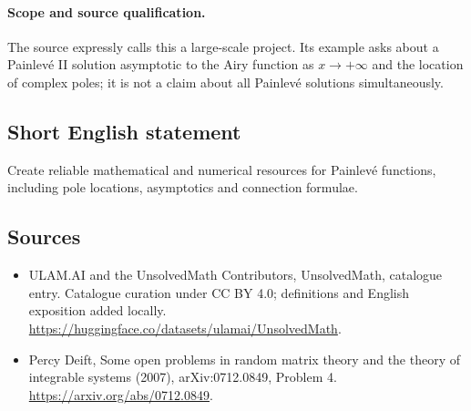 \documentclass[11pt]{article}
\begin{document}
\paragraph{Scope and source qualification.}The source expressly calls this a large-scale project. Its example asks about a Painlevé II solution asymptotic to the Airy function as $x\to+\infty$ and the location of complex poles; it is not a claim about all Painlevé solutions simultaneously.
\subsection{Short English statement}
Create reliable mathematical and numerical resources for Painlevé functions, including pole locations, asymptotics and connection formulae.
\subsection{Sources}
\begin{itemize}
\item[\hypertarget{source:statement:1}{S1}] ULAM.AI and the UnsolvedMath Contributors, UnsolvedMath, catalogue entry. Catalogue curation under CC BY 4.0; definitions and English exposition added locally.
\url{https://huggingface.co/datasets/ulamai/UnsolvedMath}.
\item[\hypertarget{source:statement:2}{S2}] Percy Deift, Some open problems in random matrix theory and the theory of integrable systems (2007), arXiv:0712.0849, Problem 4.
\url{https://arxiv.org/abs/0712.0849}.
\end{itemize}
\label{end:statement}
\end{document}
